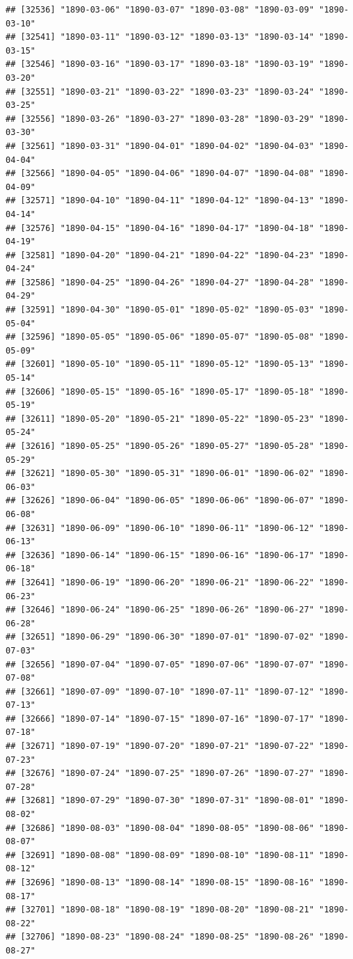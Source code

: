 \documentclass{article}\usepackage[]{graphicx}\usepackage[]{color}
\makeatletter
\newenvironment{kframe}{%
 \def\at@end@of@kframe{}%
 \ifinner\ifhmode%
  \def\at@end@of@kframe{\end{minipage}}%
  \begin{minipage}{\columnwidth}%
 \fi\fi%
 \def\FrameCommand##1{\hskip\@totalleftmargin \hskip-\fboxsep
 \colorbox{shadecolor}{##1}\hskip-\fboxsep
     \hskip-\linewidth \hskip-\@totalleftmargin \hskip\columnwidth}%
 \MakeFramed {\advance\hsize-\width
   \@totalleftmargin\z@ \linewidth\hsize
   \@setminipage}}%
 {\par\unskip\endMakeFramed%
 \at@end@of@kframe}
\newenvironment{knitrout}{}{} %
\makeatother
\begin{document}
\begin{description}
\begin{knitrout}
\begin{kframe}
\begin{verbatim}
## [32536] "1890-03-06" "1890-03-07" "1890-03-08" "1890-03-09" "1890-03-10"
## [32541] "1890-03-11" "1890-03-12" "1890-03-13" "1890-03-14" "1890-03-15"
## [32546] "1890-03-16" "1890-03-17" "1890-03-18" "1890-03-19" "1890-03-20"
## [32551] "1890-03-21" "1890-03-22" "1890-03-23" "1890-03-24" "1890-03-25"
## [32556] "1890-03-26" "1890-03-27" "1890-03-28" "1890-03-29" "1890-03-30"
## [32561] "1890-03-31" "1890-04-01" "1890-04-02" "1890-04-03" "1890-04-04"
## [32566] "1890-04-05" "1890-04-06" "1890-04-07" "1890-04-08" "1890-04-09"
## [32571] "1890-04-10" "1890-04-11" "1890-04-12" "1890-04-13" "1890-04-14"
## [32576] "1890-04-15" "1890-04-16" "1890-04-17" "1890-04-18" "1890-04-19"
## [32581] "1890-04-20" "1890-04-21" "1890-04-22" "1890-04-23" "1890-04-24"
## [32586] "1890-04-25" "1890-04-26" "1890-04-27" "1890-04-28" "1890-04-29"
## [32591] "1890-04-30" "1890-05-01" "1890-05-02" "1890-05-03" "1890-05-04"
## [32596] "1890-05-05" "1890-05-06" "1890-05-07" "1890-05-08" "1890-05-09"
## [32601] "1890-05-10" "1890-05-11" "1890-05-12" "1890-05-13" "1890-05-14"
## [32606] "1890-05-15" "1890-05-16" "1890-05-17" "1890-05-18" "1890-05-19"
## [32611] "1890-05-20" "1890-05-21" "1890-05-22" "1890-05-23" "1890-05-24"
## [32616] "1890-05-25" "1890-05-26" "1890-05-27" "1890-05-28" "1890-05-29"
## [32621] "1890-05-30" "1890-05-31" "1890-06-01" "1890-06-02" "1890-06-03"
## [32626] "1890-06-04" "1890-06-05" "1890-06-06" "1890-06-07" "1890-06-08"
## [32631] "1890-06-09" "1890-06-10" "1890-06-11" "1890-06-12" "1890-06-13"
## [32636] "1890-06-14" "1890-06-15" "1890-06-16" "1890-06-17" "1890-06-18"
## [32641] "1890-06-19" "1890-06-20" "1890-06-21" "1890-06-22" "1890-06-23"
## [32646] "1890-06-24" "1890-06-25" "1890-06-26" "1890-06-27" "1890-06-28"
## [32651] "1890-06-29" "1890-06-30" "1890-07-01" "1890-07-02" "1890-07-03"
## [32656] "1890-07-04" "1890-07-05" "1890-07-06" "1890-07-07" "1890-07-08"
## [32661] "1890-07-09" "1890-07-10" "1890-07-11" "1890-07-12" "1890-07-13"
## [32666] "1890-07-14" "1890-07-15" "1890-07-16" "1890-07-17" "1890-07-18"
## [32671] "1890-07-19" "1890-07-20" "1890-07-21" "1890-07-22" "1890-07-23"
## [32676] "1890-07-24" "1890-07-25" "1890-07-26" "1890-07-27" "1890-07-28"
## [32681] "1890-07-29" "1890-07-30" "1890-07-31" "1890-08-01" "1890-08-02"
## [32686] "1890-08-03" "1890-08-04" "1890-08-05" "1890-08-06" "1890-08-07"
## [32691] "1890-08-08" "1890-08-09" "1890-08-10" "1890-08-11" "1890-08-12"
## [32696] "1890-08-13" "1890-08-14" "1890-08-15" "1890-08-16" "1890-08-17"
## [32701] "1890-08-18" "1890-08-19" "1890-08-20" "1890-08-21" "1890-08-22"
## [32706] "1890-08-23" "1890-08-24" "1890-08-25" "1890-08-26" "1890-08-27"

\end{verbatim}
\end{kframe}
\end{knitrout}
\end{description}
\end{document}
